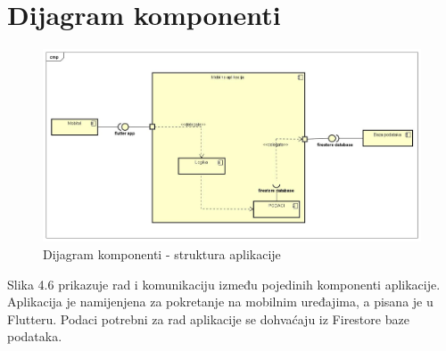 		\section{Dijagram komponenti}
		

		 	
		 	\begin{figure}[H]
		 		\centering
		 		\includegraphics[width=0.8\linewidth]{"slike/Dijagram komponenti"}
		 		\caption{Dijagram komponenti - struktura aplikacije}
		 		\label{Slika 4.6}
		 	\end{figure}
	 	
	 		Slika 4.6 prikazuje rad i komunikaciju između pojedinih komponenti aplikacije. Aplikacija je namijenjena za pokretanje na mobilnim uređajima, a pisana je u Flutteru. Podaci potrebni za rad aplikacije se dohvaćaju iz Firestore baze podataka.
			 